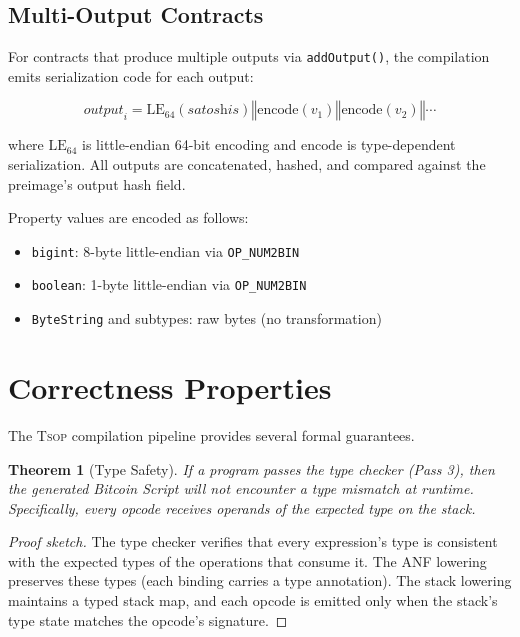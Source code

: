 \documentclass[11pt,a4paper]{article}
\newtheorem{theorem}{Theorem}[section]
\newcommand{\op}[1]{\texttt{OP\_#1}}
\newcommand{\tsop}{\textsc{Tsop}}
\newcommand{\bs}{\texttt{ByteString}}
\newcommand{\bigintty}{\texttt{bigint}}
\newcommand{\boolty}{\texttt{boolean}}
\begin{document}
\subsection{Multi-Output Contracts}
\label{sec:multi-output}

For contracts that produce multiple outputs via \texttt{addOutput()}, the
compilation emits serialization code for each output:

\[
\textit{output}_i = \text{LE}_{64}(\textit{satoshis}) \mathbin\Vert
  \text{encode}(v_1) \mathbin\Vert \text{encode}(v_2) \mathbin\Vert \cdots
\]

where $\text{LE}_{64}$ is little-endian 64-bit encoding and
$\text{encode}$ is type-dependent serialization. All outputs are
concatenated, hashed, and compared against the preimage's output hash field.

Property values are encoded as follows:
\begin{itemize}[nosep]
  \item \bigintty{}: 8-byte little-endian via \op{NUM2BIN}
  \item \boolty{}: 1-byte little-endian via \op{NUM2BIN}
  \item \bs{} and subtypes: raw bytes (no transformation)
\end{itemize}

\section{Correctness Properties}
\label{sec:correctness}

The \tsop{} compilation pipeline provides several formal guarantees.

\begin{theorem}[Type Safety]
\label{thm:type-safety}
If a program passes the type checker (Pass 3), then the generated Bitcoin
Script will not encounter a type mismatch at runtime. Specifically, every
opcode receives operands of the expected type on the stack.
\end{theorem}

\begin{proof}[Proof sketch]
The type checker verifies that every expression's type is consistent with
the expected types of the operations that consume it. The ANF lowering
preserves these types (each binding carries a type annotation). The stack
lowering maintains a typed stack map, and each opcode is emitted only when
the stack's type state matches the opcode's signature.
\end{proof}
\end{document}
